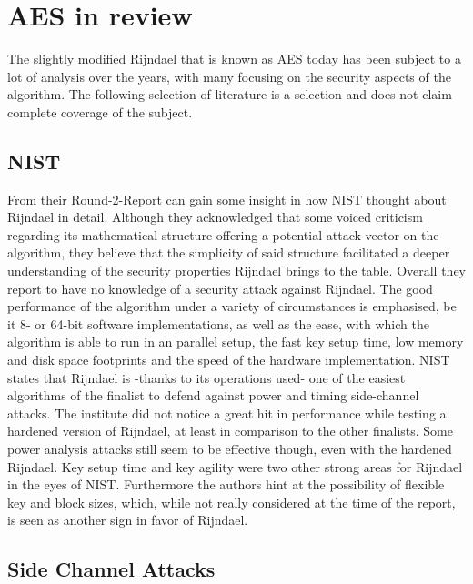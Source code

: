 \section{AES in review}
\label{ch:aes-review}

The slightly modified Rijndael that is known as AES today has been subject to a lot of analysis over the years, with many focusing on the security aspects of the algorithm. The following selection of literature is a selection and does not claim complete coverage of the subject.

\subsection{NIST}
\label{ch:nist-review}

From their Round-2-Report \cite{round2report} can gain some insight in how NIST thought about Rijndael in detail.
Although they acknowledged that some voiced criticism regarding its mathematical structure offering a potential attack vector on the algorithm, they believe that the simplicity of said structure facilitated a deeper understanding of the security properties Rijndael brings to the table. Overall they report to have no knowledge of a security attack against Rijndael.
The good performance of the algorithm under a variety of circumstances is emphasised, be it 8- or 64-bit software implementations, as well as the ease, with which the algorithm is able to run in an parallel setup, the fast key setup time, low memory and disk space footprints and the speed of the hardware implementation.
NIST states that Rijndael is -thanks to its operations used- one of the easiest algorithms of the finalist to defend against power and timing side-channel attacks. The institute did not notice a great hit in performance while testing a hardened version of Rijndael, at least in comparison to the other finalists. Some power analysis attacks still seem to be effective though, even with the hardened Rijndael.
Key setup time and key agility were two other strong areas for Rijndael in the eyes of NIST. Furthermore the authors hint at the possibility of flexible key and block sizes, which, while not really considered at the time of the report, is seen as another sign in favor of Rijndael.

\subsection{Side Channel Attacks}
\label{ch:sidechannelattacks}

